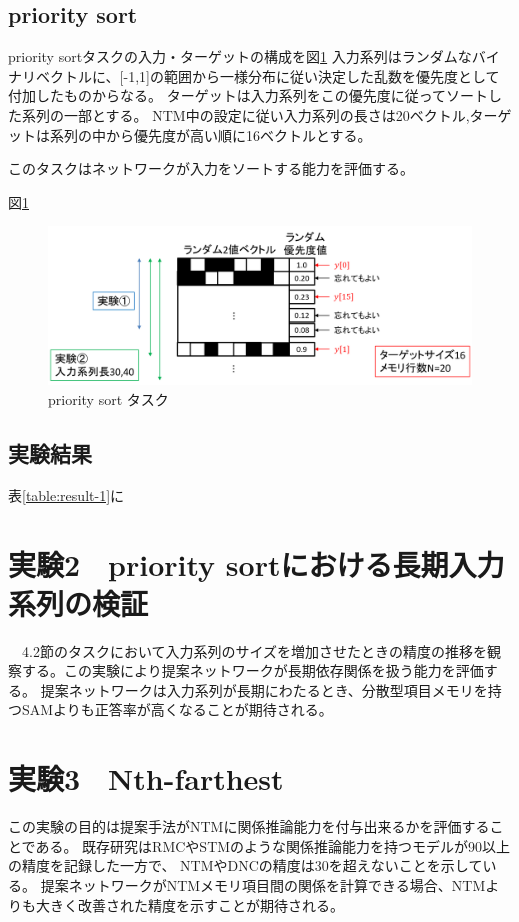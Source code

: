 \subsection{priority sort}
priority sortタスクの入力・ターゲットの構成を図\ref{fig:priority}
入力系列はランダムなバイナリベクトルに、[-1,1]の範囲から一様分布に従い決定した乱数を優先度として付加したものからなる。
ターゲットは入力系列をこの優先度に従ってソートした系列の一部とする。
NTM中の設定に従い入力系列の長さは20ベクトル,ターゲットは系列の中から優先度が高い順に16ベクトルとする。

このタスクはネットワークが入力をソートする能力を評価する。

図\ref{fig:priority}
\begin{figure}[t]
	\centering
	\includegraphics[width=\linewidth]{./figure/img_slide/priority.png}
	\caption{priority sort タスク}
	\label{fig:priority}
\end{figure}

\subsection{実験結果}
表\ref{table:result-1}に

\section{実験2　priority sortにおける長期入力系列の検証}
　4.2節のタスクにおいて入力系列のサイズを増加させたときの精度の推移を観察する。この実験により提案ネットワークが長期依存関係を扱う能力を評価する。
提案ネットワークは入力系列が長期にわたるとき、分散型項目メモリを持つSAMよりも正答率が高くなることが期待される。

\section{実験3　Nth-farthest}
この実験の目的は提案手法がNTMに関係推論能力を付与出来るかを評価することである。
既存研究\cite{rrnn}\cite{sam}はRMCやSTMのような関係推論能力を持つモデルが90以上の精度を記録した一方で、
NTMやDNCの精度は30を超えないことを示している。
提案ネットワークがNTMメモリ項目間の関係を計算できる場合、NTMよりも大きく改善された精度を示すことが期待される。

